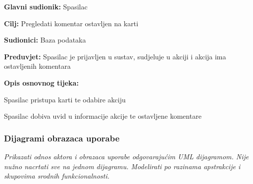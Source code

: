 					\noindent {}
					\begin{packed_item}
						
						\item \textbf{Glavni sudionik: } Spasilac
						\item  \textbf{Cilj:} Pregledati komentar ostavljen na karti
						\item  \textbf{Sudionici:} Baza podataka
						\item  \textbf{Preduvjet:} Spasilac je prijavljen u sustav, sudjeluje u akciji i akcija ima ostavljenih komentara
						\item  \textbf{Opis osnovnog tijeka:}
						
						\item[] \begin{packed_enum}
							
							\item  Spasilac pristupa karti te odabire akciju
							\item  Spasilac dobiva uvid u informacije akcije te ostavljene komentare
						\end{packed_enum}
						
					\end{packed_item}	

				\subsubsection{Dijagrami obrazaca uporabe}
					
					\textit{Prikazati odnos aktora i obrazaca uporabe odgovarajućim UML dijagramom. Nije nužno nacrtati sve na jednom dijagramu. Modelirati po razinama apstrakcije i skupovima srodnih funkcionalnosti.}
			
